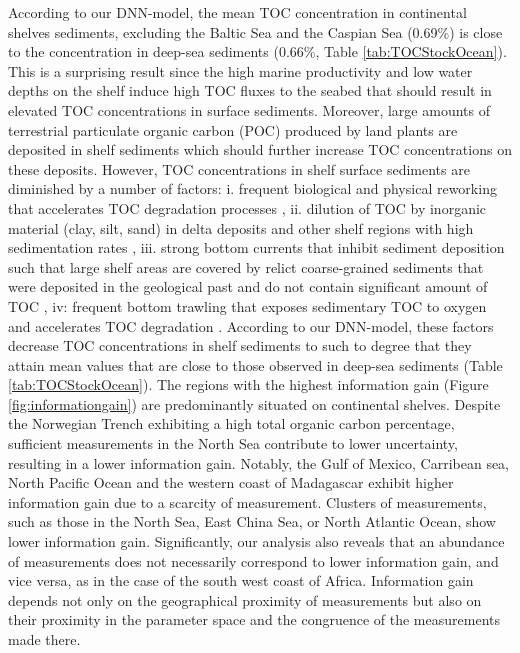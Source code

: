 \documentclass[journal abbreviation, manuscript]{copernicus}
\begin{document}
According to our DNN-model, the mean TOC concentration in continental shelves sediments, excluding the Baltic Sea and the Caspian Sea (0.69\%) is close to the concentration in deep-sea sediments (0.66\%, Table \ref{tab:TOCStockOcean}). This is a surprising result since the high marine productivity and low water depths on the shelf induce high TOC fluxes to the seabed that should result in elevated TOC concentrations in surface sediments. Moreover, large amounts of terrestrial particulate organic carbon (POC) produced by land plants are deposited in shelf sediments \citep{Burdige2005} which should further increase TOC concentrations on these deposits. However, TOC concentrations in shelf surface sediments are diminished by a number of factors: i.  frequent biological and physical reworking that accelerates TOC degradation processes \citep{song2022global}, ii. dilution of TOC by inorganic material (clay, silt, sand) in delta deposits and other shelf regions with high sedimentation rates \citep{Berner1982}, iii. strong bottom currents that inhibit sediment deposition such that large shelf areas are covered by relict coarse-grained sediments that were deposited in the geological past and do not contain significant amount of TOC \citep{emery1968relict}, iv: frequent bottom trawling that exposes sedimentary TOC to oxygen and accelerates TOC degradation \citep{atwood2020}. According to our DNN-model, these factors decrease TOC concentrations in shelf sediments to such to degree that they attain mean values that are close to those observed in deep-sea sediments (Table \ref{tab:TOCStockOcean}). 
The regions with the highest information gain (Figure \ref{fig:informationgain}) are predominantly situated on continental shelves. Despite the Norwegian Trench exhibiting a high total organic carbon percentage, sufficient measurements in the North Sea contribute to lower uncertainty, resulting in a lower information gain. Notably, the Gulf of Mexico, Carribean sea, North Pacific Ocean and the western coast of Madagascar exhibit higher information gain due to a scarcity of measurement. Clusters of measurements, such as those in the North Sea, East China Sea, or North Atlantic Ocean, show lower information gain. Significantly, our analysis also reveals that an abundance of measurements does not necessarily correspond to lower information gain, and vice versa, as in the case of the south west coast of Africa. Information gain depends not only on the geographical proximity of measurements but also on their proximity in the parameter space and the congruence of the measurements made there. 
\end{document}
